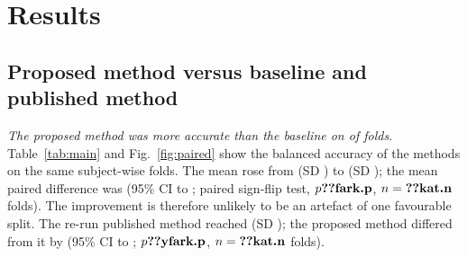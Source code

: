 \section{Results}
\label{sec:results}

\subsection{Proposed method versus baseline and published method}
\emph{The proposed method was more accurate than the baseline on  of  folds.}
Table~\ref{tab:main} and Fig.~\ref{fig:paired} show the balanced accuracy of the methods on
the same  subject-wise folds. The mean rose from  (SD
) to  (SD ); the mean paired difference was
 (95\% CI  to ; paired sign-flip test,
$p \sonuc{fark.p}$, $n = \sonuc{kat.n}$ folds). The improvement is therefore unlikely to be
an artefact of one favourable split. The re-run published method reached 
(SD ); the proposed method differed from it by  (95\% CI
 to ; $p \sonuc{yfark.p}$, $n = \sonuc{kat.n}$ folds).

